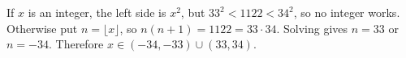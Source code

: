 If $x$ is an integer, the left side is $x^2$, but $33^2<1122<34^2$, so no integer works. Otherwise put $n=\lfloor x\rfloor$, so $n(n+1)=1122=33\cdot34$. Solving gives $n=33$ or $n=-34$. Therefore $\boxed{x\in(-34,-33)\cup(33,34)}$.
